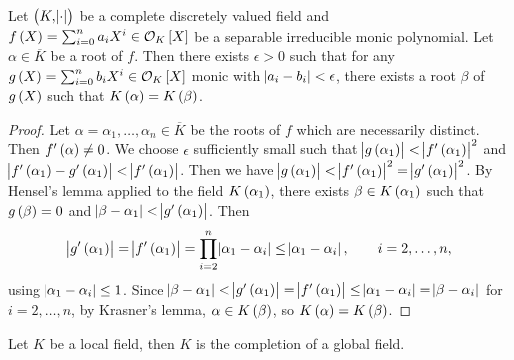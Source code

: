 \begin{proposition}
\label{prop:10.4}
Let $ \br{K, \abs{\cdot}} $ be a complete discretely valued field and $ f\br{X} = \sum_{i = 0}^n a_iX^i \in \OOO_K\sbr{X} $ be a separable irreducible monic polynomial. Let $ \alpha \in \overline{K} $ be a root of $ f $. Then there exists $ \epsilon > 0 $ such that for any $ g\br{X} = \sum_{i = 0}^n b_iX^i \in \OOO_K\sbr{X} $ monic with $ \abs{a_i - b_i} < \epsilon $, there exists a root $ \beta $ of $ g\br{X} $ such that $ K\br{\alpha} = K\br{\beta} $.
\end{proposition}

\begin{proof}
Let $ \alpha = \alpha_1, \dots, \alpha_n \in \overline{K} $ be the roots of $ f $ which are necessarily distinct. Then $ f'\br{\alpha} \ne 0 $. We choose $ \epsilon $ sufficiently small such that $ \abs{g\br{\alpha_1}} < \abs{f'\br{\alpha_1}}^2 $ and $ \abs{f'\br{\alpha_1} - g'\br{\alpha_1}} < \abs{f'\br{\alpha_1}} $. Then we have $ \abs{g\br{\alpha_1}} < \abs{f'\br{\alpha_1}}^2 = \abs{g'\br{\alpha_1}}^2 $. By Hensel's lemma applied to the field $ K\br{\alpha_1} $, there exists $ \beta \in K\br{\alpha_1} $ such that $ g\br{\beta} = 0 $ and $ \abs{\beta - \alpha_1} < \abs{g'\br{\alpha_1}} $. Then
$$ \abs{g'\br{\alpha_1}} = \abs{f'\br{\alpha_1}} = \prod_{i = 2}^n \abs{\alpha_1 - \alpha_i} \le \abs{\alpha_1 - \alpha_i}, \qquad i = 2, \dots, n, $$
using $ \abs{\alpha_1 - \alpha_i} \le 1 $. Since $ \abs{\beta - \alpha_1} < \abs{g'\br{\alpha_1}} = \abs{f'\br{\alpha_1}} \le \abs{\alpha_1 - \alpha_i} = \abs{\beta - \alpha_i} $ for $ i = 2, \dots, n $, by Krasner's lemma, $ \alpha \in K\br{\beta} $, so $ K\br{\alpha} = K\br{\beta} $.
\end{proof}

\begin{theorem}
Let $ K $ be a local field, then $ K $ is the completion of a global field.
\end{theorem}

